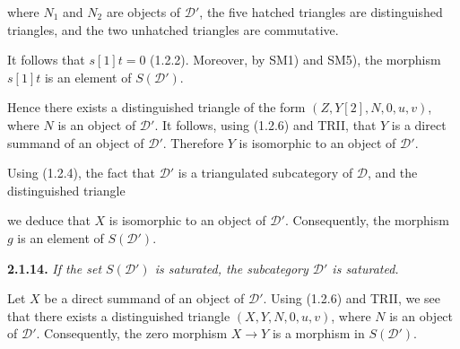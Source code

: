 \noindent where $N_1$ and $N_2$ are objects of $\mathcal D'$, the five
hatched triangles are distinguished triangles, and the two unhatched
triangles are commutative.

It follows that $s[1]t=0$ (1.2.2).
%
Moreover, by SM1) and SM5), the morphism
$s[1]t$ is an element of $S(\mathcal D')$.

Hence there exists a distinguished triangle of the form $(Z,Y[2],N,0,u,v)$,
where $N$ is an object of $\mathcal D'$.
%
It follows, using (1.2.6) and TRII, that $Y$ is a direct summand of an object
of $\mathcal D'$.
%
Therefore $Y$ is
isomorphic to an object of $\mathcal D'$.

Using (1.2.4), the fact that $\mathcal D'$ is a triangulated subcategory of
$\mathcal D$, and the distinguished triangle

\begin{center}
\end{center}

\noindent we deduce that $X$ is isomorphic to an object of $\mathcal D'$.
Consequently, the morphism $g$ is an element of $S(\mathcal D')$.

\medskip
\noindent\textbf{2.1.14.}\quad
{}%
\emph{If the set $S(\mathcal D')$ is saturated, the subcategory
$\mathcal D'$ is saturated.}

Let $X$ be a direct summand of an object of $\mathcal D'$.
%
Using (1.2.6) and
TRII, we see that there exists a distinguished triangle $(X,Y,N,0,u,v)$,
where $N$ is an object of $\mathcal D'$.
%
Consequently, the zero morphism
$X\to Y$ is a morphism in $S(\mathcal D')$.

